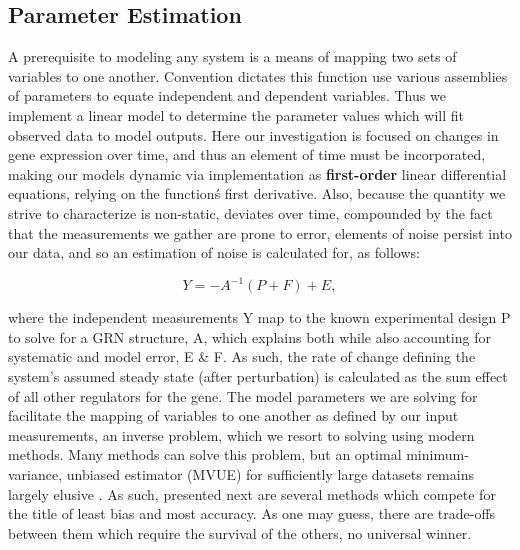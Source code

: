 \subsection{Parameter Estimation}
\label{sec:parest}
A prerequisite to modeling any system is a means of mapping two sets of variables to one another. Convention dictates this function use various assemblies of parameters to equate independent and dependent variables. Thus we implement a linear model to determine the parameter values which will fit observed data to model outputs. Here our investigation is focused on changes in gene expression over time, and thus an element of time must be incorporated, making our models dynamic via implementation as \textbf{first-order} linear differential equations, \ie relying on the function\'s first derivative. Also, because the quantity we strive to characterize is non-static, \ie deviates over time, compounded by the fact that the measurements we gather are prone to error, elements of noise persist into our data, and so an estimation of noise is calculated for, as follows:

\begin{equation}
\label{eq:Linearmap}
  Y = -A^{-1}(P+F)+ E,
\end{equation}

where the independent measurements Y map to the known experimental design P to solve for a GRN structure, A, which explains both while also accounting for systematic and model error, E \& F. As such, the rate of change defining the system's assumed steady state (after perturbation) is calculated as the sum effect of all other regulators for the gene. The model parameters we are solving for facilitate the mapping of variables to one another as defined by our input measurements, \ie an inverse problem, which we resort to solving using modern methods. Many methods can solve this problem, but an optimal minimum-variance, unbiased estimator (MVUE) for sufficiently large datasets remains largely elusive \citep{kay1993fundamentals}. As such, presented next are several methods which compete for the title of least bias and most accuracy. As one may guess, there are trade-offs between them which require the survival of the others, \ie no universal winner.



